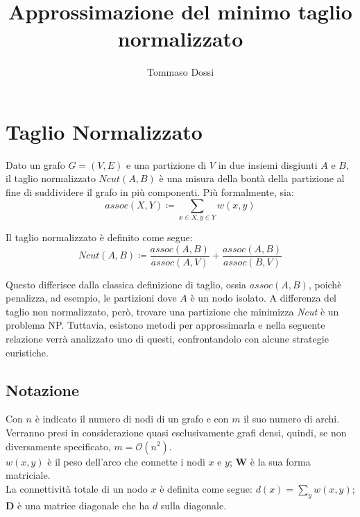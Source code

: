 \documentclass{article}
\title{Approssimazione del minimo taglio normalizzato}
\author{Tommaso Dossi}
\newcommand{\W}{\mathbf{W}}
\newcommand{\D}{\mathbf{D}}
\begin{document}
\maketitle


\section{Taglio Normalizzato}

Dato un grafo $G = (V,E)$ e una partizione di $V$ in due insiemi disgiunti $A$ e $B$,
il taglio normalizzato $Ncut(A,B)$ \`e una misura della bont\`a della partizione
al fine di suddividere il grafo in pi\`u componenti.
Pi\`u formalmente, sia:
\begin{equation*}
    assoc(X,Y) \coloneq \sum_{x \in X, y \in Y} w(x,y)
\end{equation*}

Il taglio normalizzato \`e definito come segue:
\begin{equation}
    Ncut(A,B) \coloneq \frac{assoc(A,B)}{assoc(A,V)} + \frac{assoc(A,B)}{assoc(B,V)}
\end{equation}

Questo differisce dalla classica definizione di taglio, ossia $assoc(A,B)$, poich\`e penalizza, ad esempio,
le partizioni dove $A$ \`e un nodo isolato.
A differenza del taglio non normalizzato, per\`o, trovare una partizione che minimizza \textit{Ncut} \`e un problema NP.
Tuttavia, esistono metodi per approssimarla e nella seguente relazione verr\`a analizzato uno di questi, confrontandolo con alcune strategie euristiche.

\subsection{Notazione}
Con $n$ \`e indicato il numero di nodi di un grafo e con $m$ il suo numero di archi.\\
Verranno presi in considerazione quasi esclusivamente grafi densi, quindi, se non diversamente specificato, $m = \mathcal{O}(n^2)$.\\
$w(x,y)$ \`e il peso dell'arco che connette i nodi $x$ e $y$; $\W$ \`e la sua forma matriciale.\\
La connettivit\`a totale di un nodo $x$ \`e definita come segue: $d(x) = \sum_y w(x,y)$;
$\D$ \`e una matrice diagonale che ha $d$ sulla diagonale.
\end{document}
